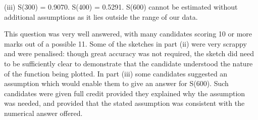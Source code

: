 \documentclass[a4paper,12pt]{article}
\begin{document}
(iii)
S(300) = 0.9070.
S(400) = 0.5291.
S(600) cannot be estimated without additional assumptions
as it lies outside the range of our data.

\newpage

This question was very well answered, with many candidates scoring 10 or more marks out of a possible 11. Some of the sketches in part (ii) were very scrappy and were penalised:
though great accuracy was not required, the sketch did need to be sufficiently clear to demonstrate that the candidate understood the nature of the function being plotted. In part (iii) some candidates suggested an assumption which would enable them to give an answer
for S(600). Such candidates were given full credit provided they explained why the assumption was needed, and provided that the stated assumption was consistent with the numerical answer offered.
\end{document}

